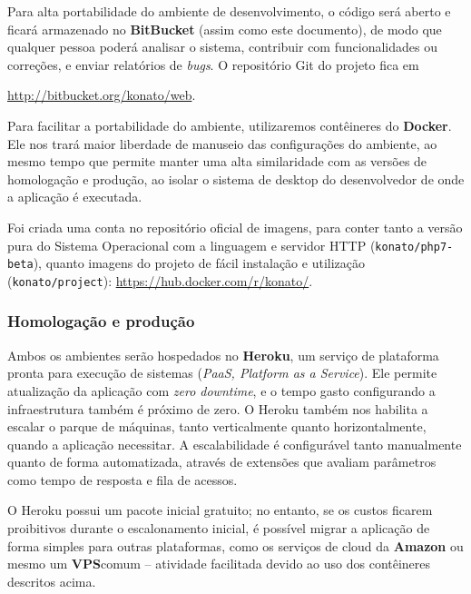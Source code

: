 \documentclass[12pt,a4paper,twoside,hyphens,english,brazil]{abntex2}
\begin{document}
Para alta portabilidade do ambiente de desenvolvimento, o código será aberto e ficará armazenado no \textbf{BitBucket} (assim como este documento), de modo que qualquer pessoa poderá analisar o sistema, contribuir com funcionalidades ou correções, e enviar relatórios de \textit{bugs}. O repositório Git do projeto fica em {\url{http://bitbucket.org/konato/web}.

Para facilitar a portabilidade do ambiente, utilizaremos contêineres do \textbf{Docker}\footnotemark. Ele nos trará maior liberdade de manuseio das configurações do ambiente, ao mesmo tempo que permite manter uma alta similaridade com as versões de homologação e produção, ao isolar o sistema de desktop do desenvolvedor de onde a aplicação é executada.\cite{docker-presentation}

Foi criada uma conta no repositório oficial de imagens, para conter tanto a versão pura do Sistema Operacional com a linguagem e servidor HTTP (\texttt{konato/php7-beta}), quanto imagens do projeto de fácil instalação e utilização (\texttt{konato/project}): \url{https://hub.docker.com/r/konato/}.


\subsubsection*{Homologação e produção}
Ambos os ambientes serão hospedados no \textbf{Heroku}, um serviço de plataforma pronta para execução de sistemas (\textit{PaaS, Platform as a Service}). Ele permite atualização da aplicação com \textit{zero downtime}, e o tempo gasto configurando a infraestrutura também é próximo de zero. O Heroku também nos habilita a escalar o parque de máquinas, tanto verticalmente quanto horizontalmente, quando a aplicação necessitar. A escalabilidade é configurável tanto manualmente quanto de forma automatizada, através de extensões que avaliam parâmetros como tempo de resposta e fila de acessos\cite{heroku-hirefire}\cite{heroku-adept}.

O Heroku possui um pacote inicial gratuito; no entanto, se os custos ficarem proibitivos durante o escalonamento inicial, é possível migrar a aplicação de forma simples para outras plataformas, como os serviços de cloud da \textbf{Amazon} ou mesmo um \textbf{VPS}\footnotemark comum -- atividade facilitada devido ao uso dos contêineres descritos acima.

}
\end{document}
